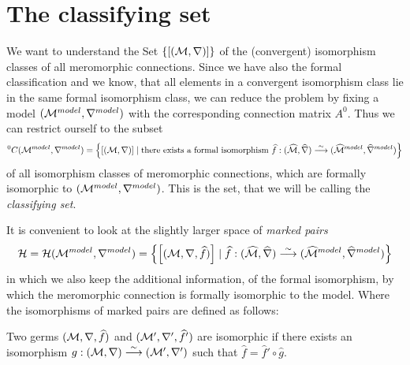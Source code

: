 \section{The classifying set}
We want to understand the Set $\{[(\mathcal{M},\nabla)]\}$ of the (convergent)
isomorphism classes of all meromorphic connections. Since we have also the
formal classification and we know, that all elements in a convergent
isomorphism class lie in the same formal isomorphism class, we can reduce the
problem by fixing a model $(\mathcal{M}^{model},\nabla^{model})$ with the corresponding
connection matrix $A^0$. Thus we can restrict ourself to the subset
\begin{align*}
  {}^0C(\mathcal{M}^{model},\nabla^{model})=\left\{
    \left[(\mathcal{M},\nabla)\right]
      \mid \text{there exists a formal isomorphism }
      \widehat f:(\widehat{\mathcal{M}},\widehat\nabla)
        \overset{\sim}\longrightarrow
        (\widehat{\mathcal{M}}^{model},\widehat\nabla^{model})
  \right\}
\end{align*}
of all isomorphism classes of
meromorphic connections, which are formally isomorphic to
$(\mathcal{M}^{model},\nabla^{model})$. This is the set, that we will be calling the
\emph{classifying set}.
\begin{comment}
  \begin{itemize}
    \item \cite{thboalch} p.6
      \begin{itemize}
        \item \cite{boalch} p.19
      \end{itemize}
    \item \cite{Loday1994} p.852
    \item \cite{sabbah2007isomonodromic} p.111
  \end{itemize}
\end{comment}

It is convenient to look at the slightly larger space of \emph{marked pairs}
\[
  \mathcal{H}=\mathcal{H}(\mathcal{M}^{model},\nabla^{model})=\left\{
    \left[(\mathcal{M},\nabla,\widehat f)\right]
      \mid
      \widehat f:(\widehat{\mathcal{M}},\widehat\nabla)
        \overset{\sim}\longrightarrow
        (\widehat{\mathcal{M}}^{model},\widehat\nabla^{model})
  \right\}
\]
in which we also keep the additional information, of the formal isomorphism, by
which the meromorphic connection is formally isomorphic to the model.
Where the isomorphisms of marked pairs are defined as follows:
\begin{defn}
  Two germs $(\mathcal{M},\nabla,\widehat f)$ and $(\mathcal{M}',\nabla',\widehat f')$ are
  isomorphic if there exists an isomorphism
  $g:(\mathcal{M},\nabla)\overset{\sim}\longrightarrow(\mathcal{M}',\nabla')$ such that
  $\hat f=\hat f'\circ \hat g$.
  \begin{comment}
    \cite[111]{sabbah2007isomonodromic}:\dots it is important to remark that
    such an isomorphism is then unique.
  \end{comment}
\end{defn}


